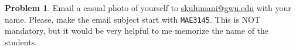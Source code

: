 \documentclass[10pt]{article}
\renewcommand{\baselinestretch}{1.2}
\theoremstyle{definition}
\newtheorem{prob}{Problem}[section]
\begin{document}
\begin{prob}
Email a casual photo of yourself to \url{skulumani@gwu.edu} with your name. Please, make the email subject start with \texttt{MAE3145}.  This is NOT mandatory, but it would be very helpful to me memorize the name of the students. 
\end{prob}

%
%
%
%
\end{document}
